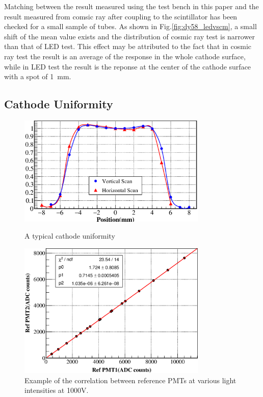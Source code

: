 \documentclass[5p, times]{elsarticle}
\begin{document}
Matching between the result measured using the test bench in this paper and the result measured from comsic ray after coupling to the scintillator has been checked for a small sample of tubes.
As shown in Fig.\ref{fig:dy58_ledvscm}, a small shift of the mean value exists and the distribution of cosmic ray test is narrower than that of LED test. 
This effect may be attributed to the fact that in cosmic ray test the result is an average of the response in the whole cathode surface, while in LED test the result is the reponse at the center of the cathode surface with a spot of \SI{1}{\milli\meter}.


\subsection{Cathode Uniformity}
\label{sec:psd_cathodescan}

\begin{figure}[h!]
 \centering
 \includegraphics[width=90mm]{cathode_uniformity}
\caption{A typical cathode uniformity}
\label{fig:cathode_uniformity}

 \centering
 \includegraphics[width=90mm]{RelativeGainRef}
\caption{Example of the correlation between reference PMTs at various light intensities at 1000V.}
\label{fig:refgain_relation}
\end{figure} 
\end{document}
